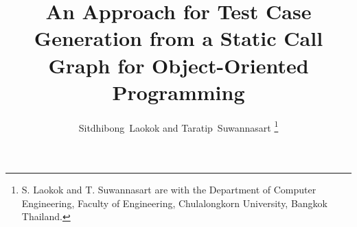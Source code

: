 \documentclass[journal]{IAENGtran}
\begin{document}
%
\title{An Approach for Test Case Generation from a Static Call Graph for Object-Oriented Programming}
%
%
%

\author{Sitdhibong~Laokok and
        Taratip~Suwannasart %
\thanks{S. Laokok and T. Suwannasart are with the Department of Computer Engineering,
        Faculty of Engineering, Chulalongkorn University, Bangkok Thailand.}}%


%
%



%
\end{document}
